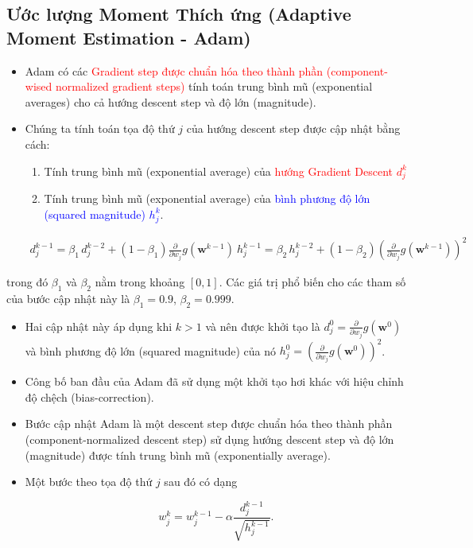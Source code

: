 \documentclass{book}
\begin{document}
\subsection{Ước lượng Moment Thích ứng (Adaptive Moment Estimation - Adam)}
\begin{itemize}
    \item Adam có các \textcolor{red}{Gradient step được chuẩn hóa theo thành phần (component-wised normalized gradient steps)} tính toán trung bình mũ (exponential averages) cho cả hướng descent step và độ lớn (magnitude).
    \item Chúng ta tính toán tọa độ thứ $j$ của hướng descent step được cập nhật bằng cách:
    \begin{enumerate}
        \item Tính trung bình mũ (exponential average) của \textcolor{red}{hướng Gradient Descent $d^{k}_j$}
        \item Tính trung bình mũ (exponential average) của \textcolor{blue}{bình phương độ lớn (squared magnitude) $h^{k}_j$}.
    \end{enumerate}
    
    \begin{equation}
        \begin{array}{c}
            d^{k-1}_j = \beta_1 \, d^{k-2}_j  + \left(1 - \beta_1\right)\frac{\partial}{\partial w_j}g\left(\mathbf{w}^{k-1}\right) \
            h_j^{k-1} = \beta_2 \, h_j^{k-2} + \left(1 - \beta_2\right)\left(\frac{\partial}{\partial w_j}g\left(\mathbf{w}^{k-1}\right)\right)^2
        \end{array}
    \end{equation}
\end{itemize}
trong đó $\beta_1$ và $\beta_2$ nằm trong khoảng $[0,1]$. Các giá trị phổ biến cho các tham số của bước cập nhật này là $\beta_1 = 0.9$, $\beta_2 = 0.999$.
\begin{itemize}
    \item Hai cập nhật này áp dụng khi $k>1$ và nên được khởi tạo là $d^0_j = \frac{\partial}{\partial w_j}g\left(\mathbf{w}^{0}\right)$ và bình phương độ lớn (squared magnitude) của nó $h^0_j = \left(\frac{\partial}{\partial w_j}g\left(\mathbf{w}^{0}\right)\right)^2$.
    \item Công bố ban đầu của Adam đã sử dụng một khởi tạo hơi khác với hiệu chỉnh độ chệch (bias-correction).
\end{itemize}
\begin{itemize}
    \item Bước cập nhật Adam là một descent step được chuẩn hóa theo thành phần (component-normalized descent step) sử dụng hướng descent step và độ lớn (magnitude) được tính trung bình mũ (exponentially average).
    \item Một bước theo tọa độ thứ $j$ sau đó có dạng

    \begin{equation}
        w_j^k = w_j^{k-1} - \alpha \frac{d^{k-1}_j}{\sqrt{h_j^{k-1}}}.
    \end{equation}

\end{itemize}
\end{document}
